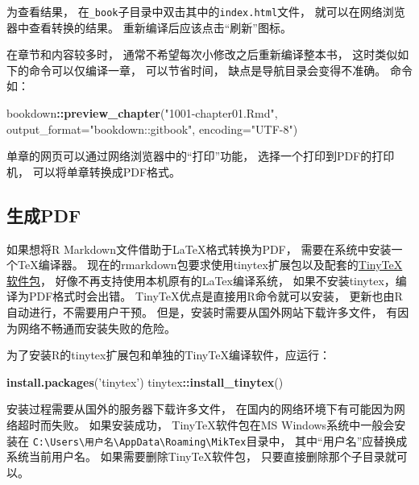 \documentclass[]{book}
\newenvironment{Shaded}{\begin{snugshade}}{\end{snugshade}}
\newcommand{\DataTypeTok}[1]{\textcolor[rgb]{0.13,0.29,0.53}{#1}}
\newcommand{\KeywordTok}[1]{\textcolor[rgb]{0.13,0.29,0.53}{\textbf{#1}}}
\newcommand{\NormalTok}[1]{#1}
\newcommand{\OperatorTok}[1]{\textcolor[rgb]{0.81,0.36,0.00}{\textbf{#1}}}
\newcommand{\StringTok}[1]{\textcolor[rgb]{0.31,0.60,0.02}{#1}}
\theoremstyle{definition}
\theoremstyle{definition}
\theoremstyle{definition}
\theoremstyle{remark}
\begin{document}
为查看结果，
在\texttt{\_book}子目录中双击其中的\texttt{index.html}文件，
就可以在网络浏览器中查看转换的结果。 重新编译后应该点击``刷新''图标。

在章节和内容较多时， 通常不希望每次小修改之后重新编译整本书，
这时类似如下的命令可以仅编译一章， 可以节省时间，
缺点是导航目录会变得不准确。 命令如：

\begin{Shaded}
\begin{Highlighting}[]
\NormalTok{bookdown}\OperatorTok{::}\KeywordTok{preview_chapter}\NormalTok{(}\StringTok{"1001-chapter01.Rmd"}\NormalTok{,}
  \DataTypeTok{output_format=}\StringTok{"bookdown::gitbook"}\NormalTok{, }\DataTypeTok{encoding=}\StringTok{"UTF-8"}\NormalTok{)}
\end{Highlighting}
\end{Shaded}

单章的网页可以通过网络浏览器中的``打印''功能，
选择一个打印到PDF的打印机， 可以将单章转换成PDF格式。

\hypertarget{usage-pdfbook}{%
\subsection{生成PDF}\label{usage-pdfbook}}

如果想将R Markdown文件借助于LaTeX格式转换为PDF，
需要在系统中安装一个TeX编译器。
现在的rmarkdown包要求使用tinytex扩展包以及配套的\href{https://yihui.name/tinytex/}{TinyTeX软件包}，
好像不再支持使用本机原有的LaTex编译系统，
如果不安装tinytex，编译为PDF格式时会出错。
TinyTeX优点是直接用R命令就可以安装， 更新也由R自动进行，不需要用户干预。
但是，安装时需要从国外网站下载许多文件，
有因为网络不畅通而安装失败的危险。

为了安装R的tinytex扩展包和单独的TinyTeX编译软件，应运行：

\begin{Shaded}
\begin{Highlighting}[]
\KeywordTok{install.packages}\NormalTok{(}\StringTok{'tinytex'}\NormalTok{)}
\NormalTok{tinytex}\OperatorTok{::}\KeywordTok{install_tinytex}\NormalTok{()}
\end{Highlighting}
\end{Shaded}

安装过程需要从国外的服务器下载许多文件，
在国内的网络环境下有可能因为网络超时而失败。 如果安装成功，
TinyTeX软件包在MS Windows系统中一般会安装在
\texttt{C:\textbackslash{}Users\textbackslash{}用户名\textbackslash{}AppData\textbackslash{}Roaming\textbackslash{}MikTex}目录中，
其中``用户名''应替换成系统当前用户名。 如果需要删除TinyTeX软件包，
只要直接删除那个子目录就可以。
\end{document}
